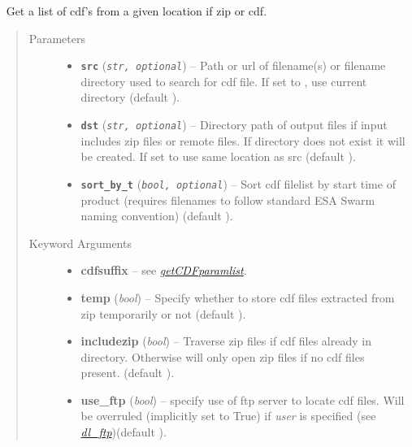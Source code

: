 \documentclass[letterpaper,10pt,english]{sphinxhowto}
\begin{document}

\begin{fulllineitems}
\label{swtools_doc:swtools.getCDFlist}~\label{swtools_doc:getcdflist}
Get a list of cdf's from a given location if zip or cdf.
\begin{quote}\begin{description}
\item[{Parameters}] \leavevmode\begin{itemize}
\item {} 
\textbf{\texttt{src}} (\emph{\texttt{str, optional}}) -- Path or url of filename(s) or filename directory used to search
for cdf file. If set to , use current directory
(default ).

\item {} 
\textbf{\texttt{dst}} (\emph{\texttt{str, optional}}) -- Directory path of output files if input includes zip files or
remote files. If directory does not exist it will be created.
If set to  use same location as src
(default ).

\item {} 
\textbf{\texttt{sort\_by\_t}} (\emph{\texttt{bool, optional}}) -- Sort cdf filelist by start time of product (requires filenames
to follow standard ESA Swarm naming convention)
(default ).

\end{itemize}

\item[{Keyword Arguments}] \leavevmode\begin{itemize}
\item {} 
\textbf{cdfsuffix} --
see {\hyperref[swtools_doc:getcdfparamlist]{\emph{getCDFparamlist}}}.

\item {} 
\textbf{temp} (\emph{bool}) --
Specify whether to store cdf files extracted from zip
temporarily or not (default ).

\item {} 
\textbf{includezip} (\emph{bool}) --
Traverse zip files if cdf files already in directory. Otherwise
will only open zip files if no cdf files present.
(default ).

\item {} 
\textbf{use\_ftp} (\emph{bool}) --
specify use of ftp server to locate cdf files. Will be
overruled (implicitly set to True) if \emph{user} is specified
(see {\hyperref[swtools_doc:dl\string-ftp]{\emph{dl\_ftp}}})(default ).


\end{itemize}
\end{description}
\end{quote}
\end{fulllineitems}
\end{document}
